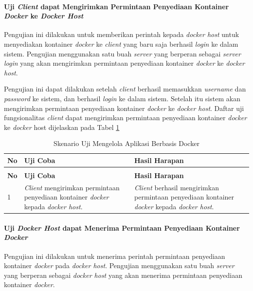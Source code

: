 \paragraph{Uji \textit{Client} dapat Mengirimkan Permintaan Penyediaan Kontainer \textit{Docker} ke \textit{Docker Host}} \label{kedua}
Pengujian ini dilakukan untuk memberikan perintah kepada \textit{docker host} untuk menyediakan kontainer \textit{docker} ke \textit{client} yang baru saja berhasil \textit{login} ke dalam sistem. Pengujian menggunakan satu buah \textit{server} yang berperan sebagai \textit{server login} yang akan mengirimkan permintaan penyediaan kontainer \textit{docker} ke \textit{docker host}.

Pengujian ini dapat dilakukan setelah \textit{client} berhasil memasukkan \textit{username} dan \textit{password} ke sistem, dan berhasil \textit{login} ke dalam sistem. Setelah itu sistem akan mengirimkan permintaan penyediaan kontainer \textit{docker} ke \textit{docker host}. Daftar uji fungsionalitas \textit{client} dapat mengirimkan permintaan penyediaan kontainer \textit{docker} ke \textit{docker} host dijelaskan pada Tabel \ref{ujicoba2}

\begin{longtable}{|p{}|p{}|p{}|}					\caption{Skenario Uji \textit{Client} dapat \textit{Login} Mengirimkan Permintaan Penyediaan Kontainer \textit{Docker}} \label{ujicoba2} \\
	\hline
	\textbf{No} & \textbf{Uji Coba} & \textbf{Hasil Harapan} \\ \hline
	\endfirsthead
	\caption[]{Skenario Uji Mengelola Aplikasi Berbasis Docker} \\
	\hline
	\textbf{No} & \textbf{Uji Coba} & \textbf{Hasil Harapan} \\ \hline
	\endhead
	\endfoot
	\endlastfoot
	
	1 & \textit{Client} mengirimkan permintaan penyediaan kontainer \textit{docker} kepada \textit{docker host}. & \textit{Client} berhasil mengirimkan permintaan penyediaan kontainer \textit{docker} kepada \textit{docker host}.\\ \hline
\end{longtable}

\paragraph{Uji \textit{Docker Host} dapat Menerima Permintaan Penyediaan Kontainer \textit{Docker}} \label{ketiga}
Pengujian ini dilakukan untuk menerima perintah permintaan penyediaan kontainer \textit{docker} pada \textit{docker host}. Pengujian menggunakan satu buah \textit{server} yang berperan sebagai \textit{docker host} yang akan menerima permintaan penyediaan kontainer \textit{docker}.


